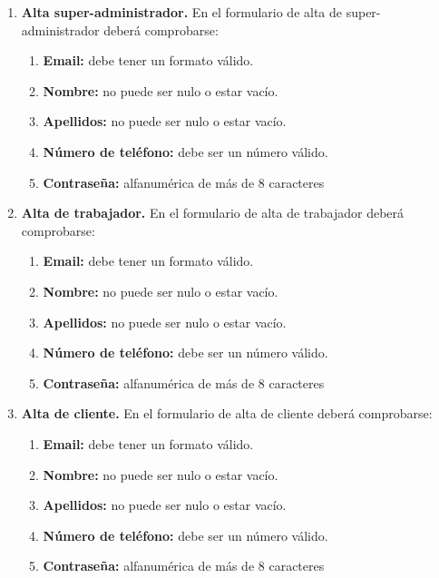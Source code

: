 \begin{enumerate}[leftmargin=1.75cm,start=1,label={\bfseries RS-\arabic*.}]
\setlength\itemsep{1em} %

    \item \textbf{Alta super-administrador.} En el formulario de alta de super-administrador deberá comprobarse:
    \begin{enumerate}[start=1,label={\bfseries RS-1.\arabic*.}]
        \item \textbf{Email:} debe tener un formato válido.
        \item \textbf{Nombre:} no puede ser nulo o estar vacío.
        \item \textbf{Apellidos:} no puede ser nulo o estar vacío.
        \item \textbf{Número de teléfono:} debe ser un número válido.
        \item \textbf{Contraseña:} alfanumérica de más de 8 caracteres
    \end{enumerate}

    \item \textbf{Alta de trabajador.} En el formulario de alta de trabajador deberá comprobarse:
    \begin{enumerate}[start=1,label={\bfseries RS-1.\arabic*.}]
        \item \textbf{Email:} debe tener un formato válido.
        \item \textbf{Nombre:} no puede ser nulo o estar vacío.
        \item \textbf{Apellidos:} no puede ser nulo o estar vacío.
        \item \textbf{Número de teléfono:} debe ser un número válido.
        \item \textbf{Contraseña:} alfanumérica de más de 8 caracteres
    \end{enumerate}

    \item \textbf{Alta de cliente.} En el formulario de alta de cliente deberá comprobarse:
    \begin{enumerate}[start=1,label={\bfseries RS-1.\arabic*.}]
        \item \textbf{Email:} debe tener un formato válido.
        \item \textbf{Nombre:} no puede ser nulo o estar vacío.
        \item \textbf{Apellidos:} no puede ser nulo o estar vacío.
        \item \textbf{Número de teléfono:} debe ser un número válido.
        \item \textbf{Contraseña:} alfanumérica de más de 8 caracteres
    \end{enumerate}


\end{enumerate}
